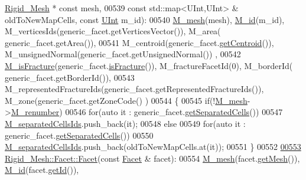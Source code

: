 \begin{DoxyCode}
      \hyperlink{classFVCode3D_1_1Rigid__Mesh}{Rigid\_Mesh} * \textcolor{keyword}{const} mesh,
00539                          \textcolor{keyword}{const} std::map<UInt,UInt> & oldToNewMapCells, \textcolor{keyword}{const} 
      \hyperlink{namespaceFVCode3D_a4bf7e328c75d0fd504050d040ebe9eda}{UInt} m\_id):
00540     \hyperlink{classFVCode3D_1_1Rigid__Mesh_1_1Edge_a64bb5c3aa3654d3234f555da2414f3b5}{M\_mesh}(mesh), \hyperlink{classFVCode3D_1_1Rigid__Mesh_1_1Edge_a534f18f2319df147a43ee837d41dddfe}{M\_id}(m\_id), M\_verticesIds(generic\_facet.getVerticesVector()), M\_area(
      generic\_facet.getArea()),
00541     M\_centroid(generic\_facet.\hyperlink{classFVCode3D_1_1Rigid__Mesh_1_1Edge_a53b678074c79d7d3115096da7c47e68e}{getCentroid}()), M\_unsignedNormal(generic\_facet.getUnsignedNormal())
      ,
00542     \hyperlink{classFVCode3D_1_1Rigid__Mesh_1_1Edge_ae0356f38073c9139078e3caa7a87c587}{M\_isFracture}(generic\_facet.\hyperlink{classFVCode3D_1_1Rigid__Mesh_1_1Edge_a337257089bfb042595dd0249be42f917}{isFracture}()), M\_fractureFacetId(0), M\_borderId(
      generic\_facet.getBorderId()),
00543     M\_representedFractureIds(generic\_facet.getRepresentedFractureIds()), M\_zone(generic\_facet.getZoneCode()
      )
00544 \{
00545     \textcolor{keywordflow}{if}(!\hyperlink{classFVCode3D_1_1Rigid__Mesh_1_1Facet_af220d353a3aad7de9b1fa293ac594893}{M\_mesh}->\hyperlink{classFVCode3D_1_1Rigid__Mesh_a3d9468c34407de926f494d4aa47af64f}{M\_renumber})
00546         \textcolor{keywordflow}{for}(\textcolor{keyword}{auto} it : generic\_facet.\hyperlink{classFVCode3D_1_1Mesh3D_1_1Facet3D_aa3daf4c15034afd5f92d977fc82f415b}{getSeparatedCells}())
00547             \hyperlink{classFVCode3D_1_1Rigid__Mesh_1_1Facet_ab6e36f3b09142a9cf4955c4be825cf11}{M\_separatedCellsIds}.push\_back(it);
00548     \textcolor{keywordflow}{else}
00549         \textcolor{keywordflow}{for}(\textcolor{keyword}{auto} it : generic\_facet.\hyperlink{classFVCode3D_1_1Mesh3D_1_1Facet3D_aa3daf4c15034afd5f92d977fc82f415b}{getSeparatedCells}())
00550             \hyperlink{classFVCode3D_1_1Rigid__Mesh_1_1Facet_ab6e36f3b09142a9cf4955c4be825cf11}{M\_separatedCellsIds}.push\_back(oldToNewMapCells.at(it));
00551 \}
00552 
\hypertarget{RigidMesh_8cpp_source.tex_l00553}{}\hyperlink{classFVCode3D_1_1Rigid__Mesh_1_1Facet_ae2371e7d4d6fc5bd8b5424270920f7f3}{00553} \hyperlink{classFVCode3D_1_1Rigid__Mesh_1_1Facet_a8f4a989d7d4512571ef9ddb01a965001}{Rigid\_Mesh::Facet::Facet}(\textcolor{keyword}{const} \hyperlink{classFVCode3D_1_1Rigid__Mesh_1_1Facet}{Facet} & facet):
00554     \hyperlink{classFVCode3D_1_1Rigid__Mesh_1_1Facet_af220d353a3aad7de9b1fa293ac594893}{M\_mesh}(facet.\hyperlink{classFVCode3D_1_1Rigid__Mesh_1_1Facet_a4397809e51ea9a304165f11f8340b6e8}{getMesh}()), \hyperlink{classFVCode3D_1_1Rigid__Mesh_1_1Facet_a00456afaee76a9be2a9beb4180a76d15}{M\_id}(facet.\hyperlink{classFVCode3D_1_1Rigid__Mesh_1_1Facet_ac499aad62ec6d2d750a6a27d17d3814a}{getId}()), 

\end{DoxyCode}
